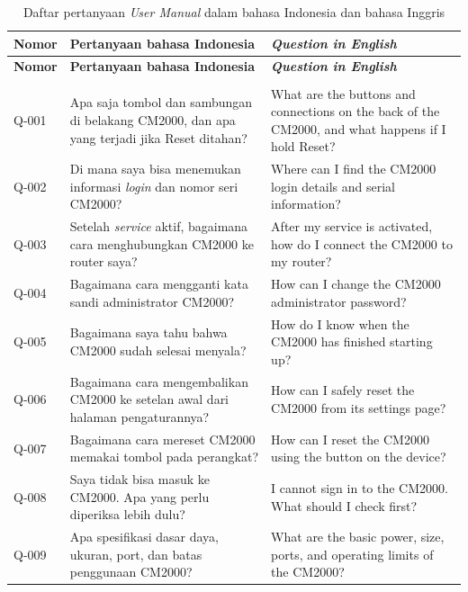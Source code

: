 \begingroup
\small
\setlength{\LTpre}{0pt}
\setlength{\LTpost}{0pt}
\renewcommand{\arraystretch}{1.12}
\begin{longtable}{@{}>{\RaggedRight\arraybackslash}p{1.6cm}>{\RaggedRight\arraybackslash}p{5.8cm}>{\RaggedRight\arraybackslash}p{\dimexpr\textwidth-1.6cm-5.8cm-4\tabcolsep\relax}@{}}
\caption{Daftar pertanyaan \emph{User Manual} dalam bahasa Indonesia dan bahasa Inggris}\label{tab:user-manual-question-list}\\
\toprule
\textbf{Nomor} & \textbf{Pertanyaan bahasa Indonesia} & \textbf{\emph{Question in English}} \\
\midrule
\endfirsthead
\toprule
\textbf{Nomor} & \textbf{Pertanyaan bahasa Indonesia} & \textbf{\emph{Question in English}} \\
\midrule
\endhead
\midrule
\multicolumn{3}{r@{}}{Bersambung ke halaman berikutnya}\\
\endfoot
\bottomrule
\endlastfoot
Q-001 & Apa saja tombol dan sambungan di belakang CM2000, dan apa yang terjadi jika Reset ditahan? & What are the buttons and connections on the back of the CM2000, and what happens if I hold Reset? \\
Q-002 & Di mana saya bisa menemukan informasi \emph{login} dan nomor seri CM2000? & Where can I find the CM2000 login details and serial information? \\
Q-003 & Setelah \emph{service} aktif, bagaimana cara menghubungkan CM2000 ke router saya? & After my service is activated, how do I connect the CM2000 to my router? \\
Q-004 & Bagaimana cara mengganti kata sandi administrator CM2000? & How can I change the CM2000 administrator password? \\
Q-005 & Bagaimana saya tahu bahwa CM2000 sudah selesai menyala? & How do I know when the CM2000 has finished starting up? \\
Q-006 & Bagaimana cara mengembalikan CM2000 ke setelan awal dari halaman pengaturannya? & How can I safely reset the CM2000 from its settings page? \\
Q-007 & Bagaimana cara mereset CM2000 memakai tombol pada perangkat? & How can I reset the CM2000 using the button on the device? \\
Q-008 & Saya tidak bisa masuk ke CM2000. Apa yang perlu diperiksa lebih dulu? & I cannot sign in to the CM2000. What should I check first? \\
Q-009 & Apa spesifikasi dasar daya, ukuran, port, dan batas penggunaan CM2000? & What are the basic power, size, ports, and operating limits of the CM2000? \\

\end{longtable}
